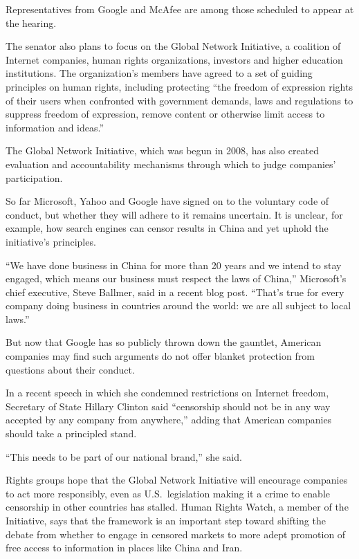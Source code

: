 ﻿\documentclass[12pt]{article}
\begin{document}
Representatives from Google and McAfee are among those scheduled to appear at the hearing.

The senator also plans to focus on the Global Network Initiative, a coalition of Internet companies,
human rights organizations, investors and higher education institutions. The organization's members
have agreed to a set of guiding principles on human rights, including protecting ``the freedom of
expression rights of their users when confronted with government demands, laws and regulations to
suppress freedom of expression, remove content or otherwise limit access to information and ideas.''

The Global Network Initiative, which was begun in 2008, has also created evaluation and
accountability mechanisms through which to judge companies' participation.

So far Microsoft, Yahoo and Google have signed on to the voluntary code of conduct, but whether they
will adhere to it remains uncertain. It is unclear, for example, how search engines can censor
results in China and yet uphold the initiative's principles.

``We have done business in China for more than 20 years and we intend to stay engaged, which means
our business must respect the laws of China,'' Microsoft's chief executive, Steve Ballmer, said in a
recent blog post. ``That's true for every company doing business in countries around the world: we
are all subject to local laws.''

But now that Google has so publicly thrown down the gauntlet, American companies may find such
arguments do not offer blanket protection from questions about their conduct.

In a recent speech in which she condemned restrictions on Internet freedom, Secretary of State
Hillary Clinton said ``censorship should not be in any way accepted by any company from anywhere,''
adding that American companies should take a principled stand.

``This needs to be part of our national brand,'' she said.

Rights groups hope that the Global Network Initiative will encourage companies to act more
responsibly, even as U.S.~legislation making it a crime to enable censorship in other countries has
stalled. Human Rights Watch, a member of the Initiative, says that the framework is an important
step toward shifting the debate from whether to engage in censored markets to more adept promotion
of free access to information in places like China and Iran.
\end{document}
